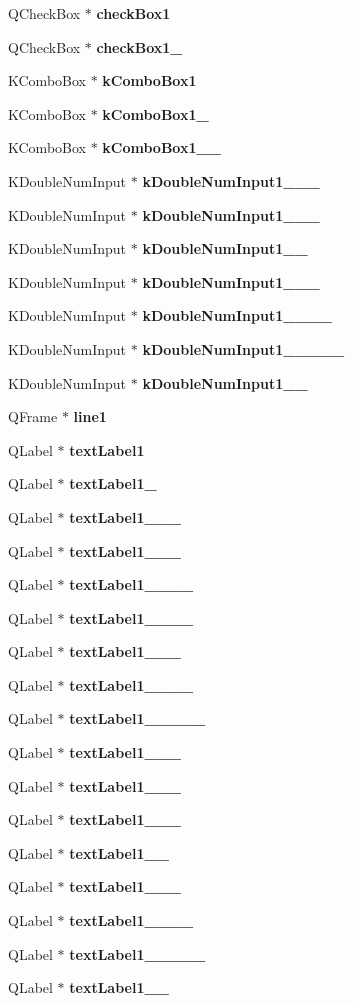 \begin{CompactItemize}
\item 
QCheck\-Box $\ast$ {\bf check\-Box1}
\item 
QCheck\-Box $\ast$ {\bf check\-Box1\_}
\item 
KCombo\-Box $\ast$ {\bf k\-Combo\-Box1}
\item 
KCombo\-Box $\ast$ {\bf k\-Combo\-Box1\_}
\item 
KCombo\-Box $\ast$ {\bf k\-Combo\-Box1\_\_}
\item 
KDouble\-Num\-Input $\ast$ {\bf k\-Double\-Num\-Input1\_\_\_}
\item 
KDouble\-Num\-Input $\ast$ {\bf k\-Double\-Num\-Input1\_\_\_}
\item 
KDouble\-Num\-Input $\ast$ {\bf k\-Double\-Num\-Input1\_\_}
\item 
KDouble\-Num\-Input $\ast$ {\bf k\-Double\-Num\-Input1\_\_\_}
\item 
KDouble\-Num\-Input $\ast$ {\bf k\-Double\-Num\-Input1\_\_\_\_}
\item 
KDouble\-Num\-Input $\ast$ {\bf k\-Double\-Num\-Input1\_\_\_\_\_}
\item 
KDouble\-Num\-Input $\ast$ {\bf k\-Double\-Num\-Input1\_\_}
\item 
QFrame $\ast$ {\bf line1}
\item 
QLabel $\ast$ {\bf text\-Label1}
\item 
QLabel $\ast$ {\bf text\-Label1\_}
\item 
QLabel $\ast$ {\bf text\-Label1\_\_\_}
\item 
QLabel $\ast$ {\bf text\-Label1\_\_\_}
\item 
QLabel $\ast$ {\bf text\-Label1\_\_\_\_}
\item 
QLabel $\ast$ {\bf text\-Label1\_\_\_\_}
\item 
QLabel $\ast$ {\bf text\-Label1\_\_\_}
\item 
QLabel $\ast$ {\bf text\-Label1\_\_\_\_}
\item 
QLabel $\ast$ {\bf text\-Label1\_\_\_\_\_}
\item 
QLabel $\ast$ {\bf text\-Label1\_\_\_}
\item 
QLabel $\ast$ {\bf text\-Label1\_\_\_}
\item 
QLabel $\ast$ {\bf text\-Label1\_\_\_}
\item 
QLabel $\ast$ {\bf text\-Label1\_\_}
\item 
QLabel $\ast$ {\bf text\-Label1\_\_\_}
\item 
QLabel $\ast$ {\bf text\-Label1\_\_\_\_}
\item 
QLabel $\ast$ {\bf text\-Label1\_\_\_\_\_}
\item 
QLabel $\ast$ {\bf text\-Label1\_\_}
\end{CompactItemize}

